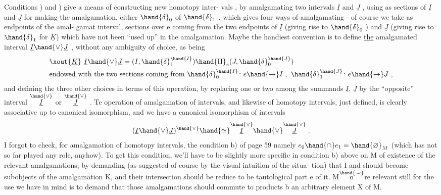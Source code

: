 Conditions ) and ) give a means of constructing new homotopy inter-%
vals ,  by amalgamating two  intervals  $\underline{I}$ and $\underline{J}$ ,  using as sections 
of $\underline{I}$ and $\underline{J}$ for making the amalgamation,  either $\hand{\ensuremath{\delta}}_0$ of $\hand{\ensuremath{\delta}}_1$ ,  which gives
four ways of amalgamating  -  of course we take as endpoints of the amal-%
gamat interval,  sections over e coming from the two endpoints of
$\underline{I}$  (giving rise to $\hand{\ensuremath{\delta}}_0$ ) and $\underline{J}$  (giving rise to $\hand{\ensuremath{\delta}}_1$ for $\underline{K}$) which have not
been ``used up'' in the amalgamation.  Maybe the handiest convention is to
define \uline{the}  amalgamated interval $\underline{I}\hand{\vee}\underline{J}$ ,  without any ambiguity of choice,
as being
\[\begin{aligned}& \xout{\underline{K}}\ \underline{I}\hand{\vee}\underline{J} = (I,\hand{\ensuremath{\delta}}_1^{\hand{\ensuremath{I}}})\hand{\amalg}_e(J,\hand{\ensuremath{\delta}}_0^{\hand{\ensuremath{J}}}) \\ &\text{endowed with  the two sections coming from } \hand{\ensuremath{\delta}}_0^{\hand{\ensuremath{I}}}\colon e\hand{\to} I \ , \ \hand{\ensuremath{\delta}}_1^{\hand{\ensuremath{J}}}\colon e\hand{\to} J \ , \end{aligned}\]
and defining the three other choices  in terms of this operation,  by
replacing one or two among the summands $\underline{I}$, $\underline{J}$  by the ``opposite'' interval
$\overset{\hand{\ensuremath{\vee}}}{\underline{I}}$  or  $\overset{\hand{\ensuremath{\vee}}}{\underline{J}}$ .  Te operation of amalgamation of intervals,  and likewise of
homotopy intervals,  just defined,  is clearly associative up to canonical
isomorphism,  and we have a canonical isomorphism of intervals
\[ (\underline{I}\hand{\vee}\underline{J})^{\hand{\ensuremath{\vee}}} \hand{\simeq} \overset{\hand{\ensuremath{\vee}}}{\underline{I}}\hand{\vee}\overset{\hand{\ensuremath{\vee}}}{\underline{J}} \ . \]
I forgot to check,  for amalgamation of homotopy intervals,  the condition
b) of page 59 namely $e_0 \hand{\cap} e_1 = \hand{\varnothing}_M$  (which has not so far played any role,
anyhow).  To get this condition,  we'll have to be slightly more specific
in condition b) above on M of existence of the relevant amalgamations,
by demanding (as suggested of course by the visual intuition of the situa-%
tion)  that I and   should become subobjects of the amalgamation K,  and
their intersection should be reduce to he tautological part e of it.
M$\overset{\hand{\smile}}{\mathrm o}$re relevant still for the use we have in mind is to demand that those
amalgamations should commute to products b an arbitrary element X of M.

